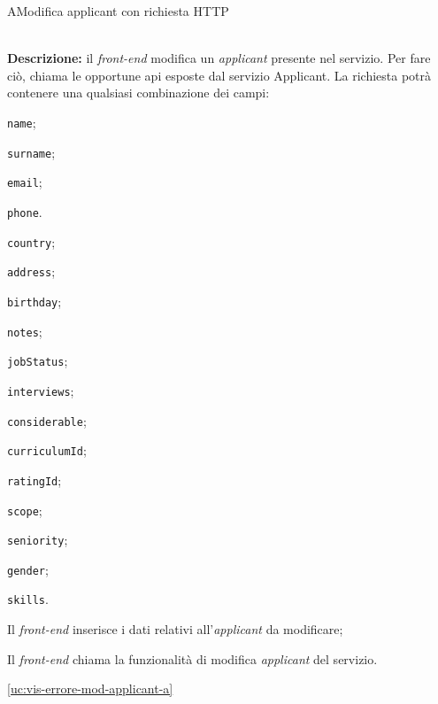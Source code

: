 \begin{usecase}{10}{A}{Modifica applicant con richiesta HTTP}


	\textbf{\\Descrizione:} il \textit{front-end} modifica un \textit{applicant} presente nel servizio. Per fare ciò,
	chiama le opportune \acrshort{api} esposte dal servizio Applicant. La richiesta potrà contenere una qualsiasi combinazione dei campi:
	\begin{ucitemize}
		\item \texttt{name};
		\item \texttt{surname};
		\item \texttt{email};
		\item \texttt{phone}.
		\item \texttt{country};
		\item \texttt{address};
		\item \texttt{birthday};
		\item \texttt{notes};
		\item \texttt{jobStatus};
		\item \texttt{interviews};
		\item \texttt{considerable};
		\item \texttt{curriculumId};
		\item \texttt{ratingId};
		\item \texttt{scope};
		\item \texttt{seniority};
		\item \texttt{gender};
		\item \texttt{skills}.
	\end{ucitemize}

	\begin{ucscenarioprincipale}
		\item Il \textit{front-end} inserisce i dati relativi all'\textit{applicant} da modificare;
		\item Il \textit{front-end} chiama la funzionalità di modifica \textit{applicant} del servizio.
	\end{ucscenarioprincipale}


	\begin{ucestensioni}
		\item \ref{uc:vis-errore-mod-applicant-a}
	\end{ucestensioni}

	\label{uc:richiesta-mod-applicant-a}
\end{usecase}

